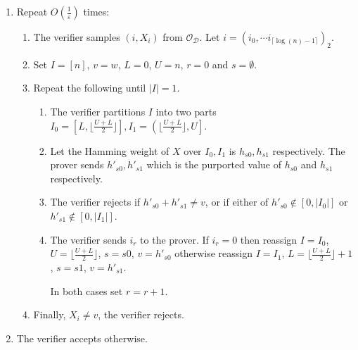 \documentclass[11pt]{article}
\makeatletter
\newcommand{\HAM}{\mathsf{HAM}}
\newcommand{\sD}{\mathcal{D}}
\newcommand{\sO}{\mathcal{O}}
\newenvironment{protocol}[1][htb]{
    \renewcommand{\ALG@name}{Protocol}
    \begin{algorithm}[#1]
    }{\end{algorithm}
}
\makeatother
\begin{document}
\begin{protocol}
\caption{Interactive Proof of $\varepsilon$-proximity  for $\HAM(w)$}
\label{pcl:hamub}
\begin{enumerate}
    \item Repeat $O\left(\frac{1}{\varepsilon}\right)$ times:\label{erep}
\begin{enumerate}
    \item The verifier samples $(i,X_i)$ from $\sO_\sD$. Let $i=(i_{0}, \cdots i_{\lceil \log(n)-1\rceil})_{2}$.
    \item Set $I=[n]$, $v=w$, $L=0$, $U=n$, $r=0$ and $s= \emptyset$.
    \item Repeat the following until $\vert I\vert =1$. \label{binSplit}
    \begin{enumerate}
        \item The verifier partitions $I$ into two parts $I_{0}=\left[ L,\lfloor\frac{U+L}{2}\rfloor \right], I_{1}=\left(\lfloor\frac{U+L}{2}\rfloor , U\right]$.
        \item\label{hSent} Let the Hamming weight of $X$ over $I_{0}, I_{1}$ is $h_{s0}, h_{s1}$ respectively. The prover sends $h'_{s0},h'_{s1}$ which is the purported value of $h_{s0}$ and $h_{s1}$ respectively.
        \item \label{ConsCheck}The verifier rejects if $h'_{s0}+h'_{s1}\neq v$, or if either of $h'_{s0} \notin [0,\vert I_0 \vert]$ or $h'_{s1} \notin [0,\vert I_1 \vert]$.
        \item The verifier sends $i_{r}$ to the prover. If $i_{r}=0$ then reassign $I=I_{0}$, $U=\lfloor\frac{U+L}{2}\rfloor$,  $s=s0$, $v=h'_{s0}$ otherwise reassign $I=I_{1}$, $L=\lfloor\frac{U+L}{2}\rfloor+1$, $s=s1$, $v=h'_{s1}$. 
        
        In both cases set $r=r+1$.
    \end{enumerate}
    \item \label{samples} Finally, $X_{i}\neq v$, the verifier rejects.
\end{enumerate}
\item The verifier accepts otherwise.
\end{enumerate}
\end{protocol}
\end{document}
